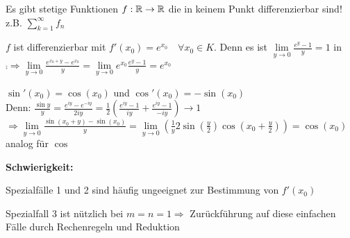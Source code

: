 	\begin{bemerkung}
		Es gibt stetige Funktionen $f:\mathbb{R}\to \mathbb{R}$ die in keinem Punkt differenzierbar sind! \\
		z.B. $\sum\limits_{k=1}^{\infty} f_n$
	\end{bemerkung}

	\begin{beispiel}[$f:K\to K$ mit $f(x)=e^x$]
		$f$ ist differenzierbar mit $f'(x_0)=e^{x_0}\quad\forall x_0\in K$. Denn es ist $\lim\limits_{y\to 0} 
		\frac{e^y-1}{y}=1$ in $\comp \Rightarrow \lim\limits_{y\to 0} \frac{e^{x_0+y}-e^{x_0}}{y}=
		\lim\limits_{y\to 0} e^{x_0}\frac{e^y-1}{y}=e^{x_0}$
	\end{beispiel}

	\begin{beispiel}
		$\sin'(x_0)=\cos(x_0)$ und $\cos'(x_0)=-\sin(x_0)$ \\
		Denn: $\frac{\sin y}{y}=\frac{e^{iy}-e^{-iy}}{2iy}=\frac{1}{2}\left( \frac{e^{iy}-1}{iy}+
		\frac{e^{iy}-1}{-iy}\right) \to 1$ \\
		$\Rightarrow \lim\limits_{y\to 0} \frac{\sin(x_0+y)-\sin(x_0)}{y}=\lim\limits_{y\to 0} \left(
		 \frac{1}{y}2\sin(\frac{y}{2})\cos(x_0+\frac{y}{2}) \right) =\cos(x_0)$ \\
		 analog für $\cos$
	\end{beispiel}

	\textbf{Schwierigkeit:}
	\begin{compactitem}
		\item Spezialfälle 1 und 2 sind häufig ungeeignet zur Bestimmung von $f'(x_0)$
		\item Spezialfall 3 ist nützlich bei $m=n=1 \Rightarrow$ Zurückführung auf diese einfachen Fälle 
		durch Rechenregeln und Reduktion
	\end{compactitem}

